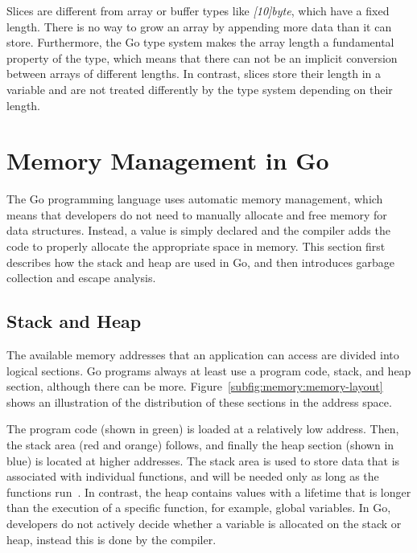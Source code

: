 Slices are different from array or buffer types like \textit{[10]byte}, which have a fixed length.
There is no way to grow an array by appending more data than it can store.
Furthermore, the Go type system makes the array length a fundamental property of the type, which means that there can
not be an implicit conversion between arrays of different lengths.
In contrast, slices store their length in a variable and are not treated differently by the type system depending on
their length.



\section{Memory Management in Go}\label{sec:background:memory}

The Go programming language uses automatic memory management, which means that developers do not need to manually
allocate and free memory for data structures.
Instead, a value is simply declared and the compiler adds the code to properly allocate the appropriate space in memory.
This section first describes how the stack and heap are used in Go, and then introduces garbage collection and escape
analysis.



\subsection{Stack and Heap}\label{subsec:background:memory:stack-heap}

The available memory addresses that an application can access are divided into logical sections.
Go programs always at least use a program code, stack, and heap section, although there can be more.
Figure~\ref{subfig:memory:memory-layout} shows an illustration of the distribution of these sections in the address
space.



The program code (shown in green) is loaded at a relatively low address.
Then, the stack area (red and orange) follows, and finally the heap section (shown in blue) is located at higher
addresses.
The stack area is used to store data that is associated with individual functions, and will be needed only as long as
the functions run~\cite{ferres2010}.
In contrast, the heap contains values with a lifetime that is longer than the execution of a specific function, for
example, global variables.
In Go, developers do not actively decide whether a variable is allocated on the stack or heap, instead this is done by
the compiler.

